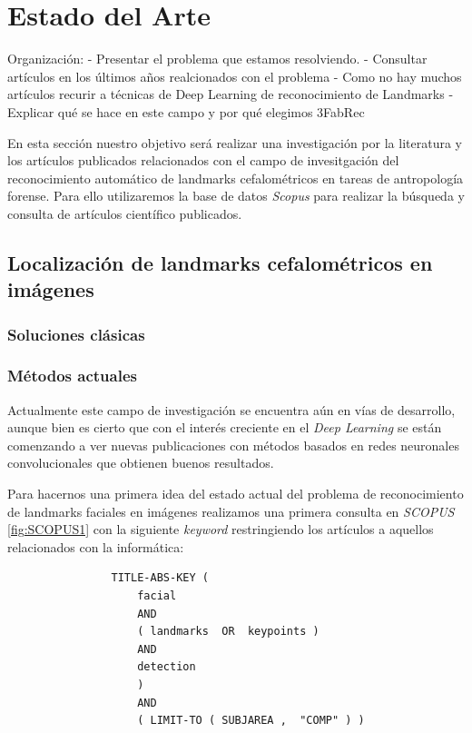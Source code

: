 
\chapter{Estado del Arte}
    Organización: 
        - Presentar el problema que estamos resolviendo.
        - Consultar artículos en los últimos años realcionados con el problema
        - Como no hay muchos artículos recurir a técnicas de Deep Learning de reconocimiento de Landmarks 
        - Explicar qué se hace en este campo y por qué elegimos 3FabRec

    \noindent En esta sección nuestro objetivo será realizar una investigación por la literatura y los artículos publicados relacionados con el campo de invesitgación del reconocimiento automático de landmarks cefalométricos en tareas de antropología forense. Para ello utilizaremos la base de datos \textit{Scopus} para realizar la búsqueda y consulta de artículos científico publicados.

    \section{Localización de landmarks cefalométricos en imágenes}
        \subsection{Soluciones clásicas}

        \subsection{Métodos actuales}
            \noindent Actualmente este campo de investigación se encuentra aún en vías de desarrollo, aunque bien es cierto que con el interés creciente en el \textit{Deep Learning} se están comenzando a ver nuevas publicaciones con métodos basados en redes neuronales convolucionales que obtienen buenos resultados. 

            \medskip

            \noindent Para hacernos una primera idea del estado actual del problema de reconocimiento de landmarks faciales en imágenes realizamos una primera consulta en \textit{SCOPUS} \autoref{fig:SCOPUS1} con la siguiente \textit{keyword} restringiendo los artículos a aquellos relacionados con la informática:
            
            \begin{verbatim}
                TITLE-ABS-KEY ( 
                    facial  
                    AND  
                    ( landmarks  OR  keypoints )  
                    AND  
                    detection 
                    )  
                    AND  
                    ( LIMIT-TO ( SUBJAREA ,  "COMP" ) )
            \end{verbatim}
            
